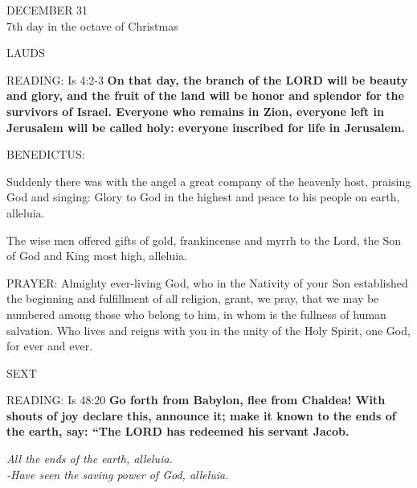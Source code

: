 \begin{center} DECEMBER 31\\
\footnotesize {7th day in the octave of Christmas}\end{center}

\begin{flushleft}\normalsize{\uppercase{LAUDS\\}}\end{flushleft}
\noindent\small{\uppercase{READING:}}    Is 4:2-3 \textbf{    On that day, the branch of the LORD will be beauty and glory, and the fruit of the land will be honor and splendor for the survivors of Israel. Everyone who remains in Zion, everyone left in Jerusalem will be called holy: everyone inscribed for life in Jerusalem.\\}

\noindent\small{\uppercase{BENEDICTUS:}} \begin{description}[labelindent=\parindent, leftmargin=*]
\item [(before the Epiphany)] Suddenly there was with the angel a great company of the heavenly host, praising God and singing: Glory to God in the highest and peace to his people on earth, alleluia.\\
\item [(Tuesday after the Epiphany)] The wise men offered gifts of gold, frankincense and myrrh to the Lord, the Son of God and King most high, alleluia.
\end{description}

\noindent\small{\uppercase{PRAYER:}}	Almighty ever-living God, who in the Nativity of your Son established the beginning and fulfillment of all religion, grant, we pray, that we may be numbered among those who belong to him, in whom is the fullness of human salvation. Who lives and reigns with you in the unity of the Holy Spirit, one God, for ever and ever.

\begin{flushleft}\normalsize{\uppercase{SEXT\\}}\end{flushleft}
\noindent\small{\uppercase{READING:}}    Is 48:20 \textbf{    Go forth from Babylon, flee from Chaldea! With shouts of joy declare this, announce it; make it known to the ends of the earth, say: “The LORD has redeemed his servant Jacob.}
\begin{center} \textit{All the ends of the earth, alleluia.\\
-Have seen the saving power of God, alleluia.} \end{center}
